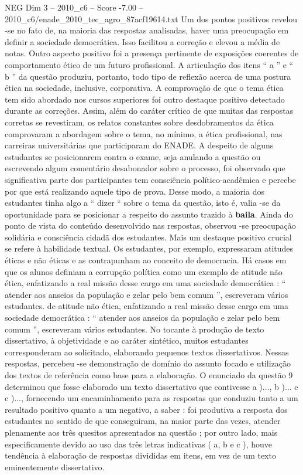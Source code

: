 \begin{textsample}{NEG Dim 3 – 2010\_c6 – Score -7.00 – 2010\_c6/enade\_2010\_tec\_agro\_87acf19614.txt}
Um dos pontos positivos revelou -se no fato de, na maioria das respostas analisadas, haver uma preocupação em definir a sociedade democrática.
Isso facilitou a correção e elevou a média de notas.
Outro aspecto positivo foi a presença pertinente de exposições coerentes de comportamento ético de um futuro profissional.
A articulação dos itens “ a ” e “ b ” da questão produziu, portanto, todo tipo de reflexão acerca de uma postura ética na sociedade, inclusive, corporativa.
A comprovação de que o tema ética tem sido abordado nos cursos superiores foi outro destaque positivo detectado durante as correções.
Assim, além do caráter crítico de que muitas das respostas corretas se revestiram, os relatos constantes sobre desdobramentos da ética comprovaram a abordagem sobre o tema, no mínimo, a ética profissional, nas carreiras universitárias que participaram do ENADE.
A despeito de alguns estudantes se posicionarem contra o exame, seja anulando a questão ou escrevendo algum comentário desabonador sobre o processo, foi observado que significativa parte dos participantes tem consciência político-acadêmica e percebe por que está realizando aquele tipo de prova.
Desse modo, a maioria dos estudantes tinha algo a “ dizer “ sobre o tema da questão, isto é, valia -se da oportunidade para se posicionar a respeito do assunto trazido à \textbf{baila}.
Ainda do ponto de vista do conteúdo desenvolvido nas respostas, observou -se preocupação solidária e consciência cidadã dos estudantes.
Mais um destaque positivo crucial se refere à habilidade textual.
Os estudantes, por exemplo, expressaram atitudes éticas e não éticas e as contrapunham ao conceito de democracia.
Há casos em que os alunos definiam a corrupção política como um exemplo de atitude não ética, enfatizando a real missão desse cargo em uma sociedade democrática : “ atender aos anseios da população e zelar pelo bem comum ”, escreveram vários estudantes. de atitude não ética, enfatizando a real missão desse cargo em uma sociedade democrática : “ atender aos anseios da população e zelar pelo bem comum ”, escreveram vários estudantes.
No tocante à produção de texto dissertativo, à objetividade e ao caráter sintético, muitos estudantes corresponderam ao solicitado, elaborando pequenos textos dissertativos.
Nessas respostas, percebeu -se demonstração de domínio do assunto focado e utilização dos textos de referência como base para a elaboração.
O enunciado da questão 9 determinou que fosse elaborado um texto dissertativo que contivesse a )..., b )... e c )..., fornecendo um encaminhamento para as respostas que conduziu tanto a um resultado positivo quanto a um negativo, a saber : foi produtiva a resposta dos estudantes no sentido de que conseguiram, na maior parte das vezes, atender plenamente aos três quesitos apresentados na questão ; por outro lado, mais especificamente devido ao uso das três letras indicativas ( a, b e c ), houve tendência à elaboração de respostas divididas em itens, em vez de um texto eminentemente dissertativo.

\end{textsample}
